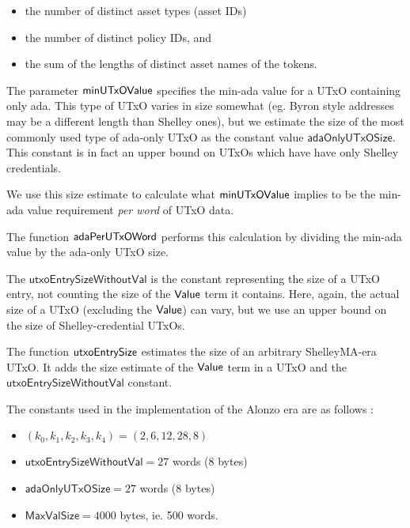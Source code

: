 \begin{itemize}
  \item the number of distinct asset types (asset IDs)
  \item the number of distinct policy IDs, and
  \item the sum of the lengths of distinct asset names of the tokens.
\end{itemize}

The parameter $\mathsf{minUTxOValue}$ specifies the min-ada value for a UTxO containing
only ada. This type of UTxO varies in size somewhat (eg. Byron style addresses
may be a different length than Shelley ones), but we estimate the size of the most commonly
used type of ada-only UTxO as the constant value $\mathsf{adaOnlyUTxOSize}$.
This constant is in fact an upper bound on UTxOs which have have only Shelley credentials.

We use this size estimate
to calculate what $\mathsf{minUTxOValue}$ implies to be the min-ada value requirement
\emph{per word} of UTxO data.

The function $\mathsf{adaPerUTxOWord}$ performs this calculation by dividing the
min-ada value by the ada-only UTxO size.

The $\mathsf{utxoEntrySizeWithoutVal}$ is the constant representing 
the size of a UTxO entry, not counting the size of the $\mathsf{Value}$ term it contains.
Here, again, the actual size of a UTxO (excluding the $\mathsf{Value}$) can vary, but
we use an upper bound on the size of Shelley-credential UTxOs.

The function $\mathsf{utxoEntrySize}$ estimates the size of an arbitrary ShelleyMA-era
UTxO. It adds the size estimate of the $\mathsf{Value}$ term in a UTxO and the
$\mathsf{utxoEntrySizeWithoutVal}$ constant.

The constants used in the implementation of the Alonzo era are as follows :

\begin{itemize}
  \item $(k_0, k_1, k_2, k_3, k_4) = (2, 6, 12, 28, 8)$
  \item $\mathsf{utxoEntrySizeWithoutVal} = 27$ words (8 bytes)
  \item $\mathsf{adaOnlyUTxOSize} = 27$ words (8 bytes)
  \item $\mathsf{MaxValSize} = 4000$ bytes, ie. 500 words.
\end{itemize}
